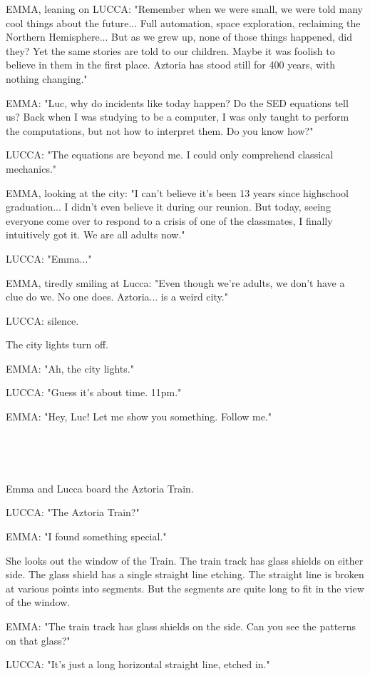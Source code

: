 \documentclass[11pt]{article}
\begin{document}
EMMA, leaning on LUCCA: "Remember when we were small, we were told many cool things about the future...
Full automation, space exploration, reclaiming the Northern Hemisphere...
But as we grew up, none of those things happened, did they?
Yet the same stories are told to our children.
Maybe it was foolish to believe in them in the first place.
Aztoria has stood still for 400 years, with nothing changing."

EMMA: "Luc, why do incidents like today happen?
Do the SED equations tell us?
Back when I was studying to be a computer, I was only taught to perform the computations, but not how to interpret them.
Do you know how?"

LUCCA: "The equations are beyond me.
I could only comprehend classical mechanics."

EMMA, looking at the city: "I can't believe it's been 13 years since highschool graduation...
I didn't even believe it during our reunion.
But today, seeing everyone come over to respond to a crisis of one of the classmates, I finally intuitively got it.
We are all adults now."

LUCCA: "Emma..."

EMMA, tiredly smiling at Lucca: "Even though we're adults, we don't have a clue do we. 
No one does.
Aztoria... is a weird city."

LUCCA: silence.

The city lights turn off.

EMMA: "Ah, the city lights."

LUCCA: "Guess it's about time. 11pm."

EMMA: "Hey, Luc! Let me show you something. Follow me."

\ 

\ 

Emma and Lucca board the Aztoria Train.

LUCCA: "The Aztoria Train?"

EMMA: "I found something special."

She looks out the window of the Train.
The train track has glass shields on either side.
The glass shield has a single straight line etching.
The straight line is broken at various points into segments.
But the segments are quite long to fit in the view of the window.

EMMA: "The train track has glass shields on the side.
Can you see the patterns on that glass?"

LUCCA: "It's just a long horizontal straight line, etched in."
\end{document}
